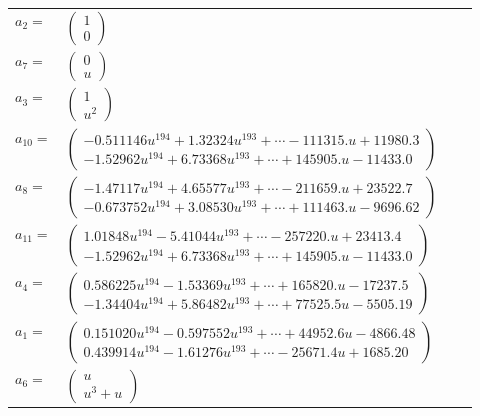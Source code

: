 \documentclass[1p]{elsarticle_modified}
\theoremstyle{definition}
\begin{document}
\begin{tabular}{m{7pt} m{180pt} m{7pt} m{180pt} }
\flushright $a_{2}=$&$\begin{pmatrix}1\\0\end{pmatrix}$ \\
\flushright $a_{7}=$&$\begin{pmatrix}0\\u\end{pmatrix}$ \\
\flushright $a_{3}=$&$\begin{pmatrix}1\\u^2\end{pmatrix}$ \\
\flushright $a_{10}=$&$\begin{pmatrix}-0.511146 u^{194}+1.32324 u^{193}+\cdots-111315. u+11980.3\\-1.52962 u^{194}+6.73368 u^{193}+\cdots+145905. u-11433.0\end{pmatrix}$ \\
\flushright $a_{8}=$&$\begin{pmatrix}-1.47117 u^{194}+4.65577 u^{193}+\cdots-211659. u+23522.7\\-0.673752 u^{194}+3.08530 u^{193}+\cdots+111463. u-9696.62\end{pmatrix}$ \\
\flushright $a_{11}=$&$\begin{pmatrix}1.01848 u^{194}-5.41044 u^{193}+\cdots-257220. u+23413.4\\-1.52962 u^{194}+6.73368 u^{193}+\cdots+145905. u-11433.0\end{pmatrix}$ \\
\flushright $a_{4}=$&$\begin{pmatrix}0.586225 u^{194}-1.53369 u^{193}+\cdots+165820. u-17237.5\\-1.34404 u^{194}+5.86482 u^{193}+\cdots+77525.5 u-5505.19\end{pmatrix}$ \\
\flushright $a_{1}=$&$\begin{pmatrix}0.151020 u^{194}-0.597552 u^{193}+\cdots+44952.6 u-4866.48\\0.439914 u^{194}-1.61276 u^{193}+\cdots-25671.4 u+1685.20\end{pmatrix}$ \\
\flushright $a_{6}=$&$\begin{pmatrix}u\\u^3+u\end{pmatrix}$ \\

\end{tabular}
\end{document}
